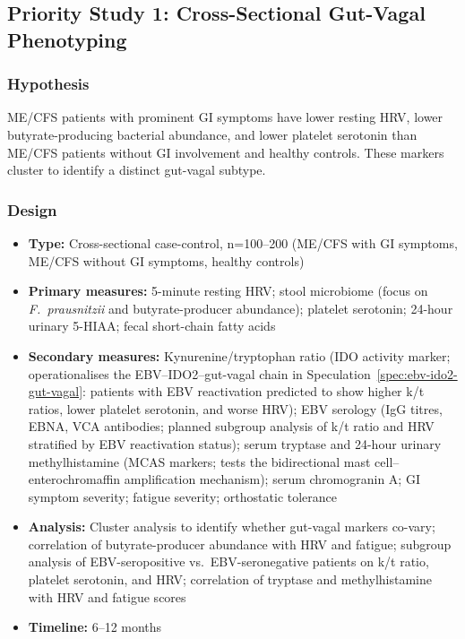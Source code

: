 \subsection{Priority Study 1: Cross-Sectional Gut-Vagal Phenotyping}

\subsubsection{Hypothesis}

ME/CFS patients with prominent GI symptoms have lower resting HRV, lower butyrate-producing bacterial abundance, and lower platelet serotonin than ME/CFS patients without GI involvement and healthy controls. These markers cluster to identify a distinct gut-vagal subtype.

\subsubsection{Design}
\begin{itemize}
    \item \textbf{Type:} Cross-sectional case-control, n=100--200 (ME/CFS with GI symptoms, ME/CFS without GI symptoms, healthy controls)
    \item \textbf{Primary measures:} 5-minute resting HRV; stool microbiome (focus on \textit{F.\ prausnitzii} and butyrate-producer abundance); platelet serotonin; 24-hour urinary 5-HIAA; fecal short-chain fatty acids
    \item \textbf{Secondary measures:} Kynurenine/tryptophan ratio (IDO activity marker; operationalises the EBV--IDO2--gut-vagal chain in Speculation~\ref{spec:ebv-ido2-gut-vagal}: patients with EBV reactivation predicted to show higher k/t ratios, lower platelet serotonin, and worse HRV); EBV serology (IgG titres, EBNA, VCA antibodies; planned subgroup analysis of k/t ratio and HRV stratified by EBV reactivation status); serum tryptase and 24-hour urinary methylhistamine (MCAS markers; tests the bidirectional mast cell--enterochromaffin amplification mechanism); serum chromogranin A; GI symptom severity; fatigue severity; orthostatic tolerance
    \item \textbf{Analysis:} Cluster analysis to identify whether gut-vagal markers co-vary; correlation of butyrate-producer abundance with HRV and fatigue; subgroup analysis of EBV-seropositive vs.\ EBV-seronegative patients on k/t ratio, platelet serotonin, and HRV; correlation of tryptase and methylhistamine with HRV and fatigue scores
    \item \textbf{Timeline:} 6--12 months
\end{itemize}

